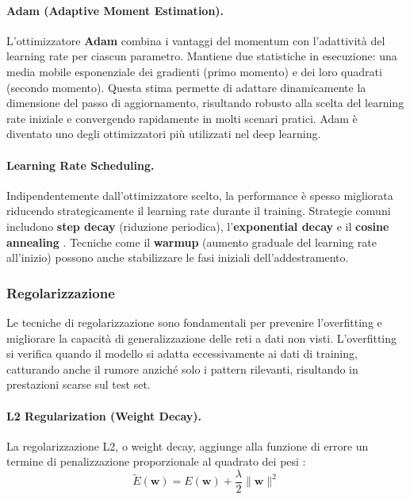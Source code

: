 \paragraph{Adam (Adaptive Moment Estimation).}
L'ottimizzatore \textbf{Adam} \cite{kingma2014adam} combina i vantaggi del momentum con l'adattività del learning rate per ciascun parametro. Mantiene due statistiche in esecuzione: una media mobile esponenziale dei gradienti (primo momento) e dei loro quadrati (secondo momento). Questa stima permette di adattare dinamicamente la dimensione del passo di aggiornamento, risultando robusto alla scelta del learning rate iniziale e convergendo rapidamente in molti scenari pratici. Adam è diventato uno degli ottimizzatori più utilizzati nel deep learning.

\paragraph{Learning Rate Scheduling.} Indipendentemente dall'ottimizzatore scelto, la performance è spesso migliorata riducendo strategicamente il learning rate durante il training. 
Strategie comuni includono \textbf{step decay} (riduzione periodica), l'\textbf{exponential decay} e il \textbf{cosine annealing} \cite{goodfellow2016deep}. Tecniche come il \textbf{warmup} (aumento graduale del learning rate all'inizio) possono anche stabilizzare le fasi iniziali dell'addestramento.


\subsubsection{Regolarizzazione}

Le tecniche di regolarizzazione sono fondamentali per prevenire l'overfitting e migliorare la capacità di generalizzazione delle reti a dati non visti. L'overfitting si verifica quando il modello si adatta eccessivamente ai dati di training, catturando anche il rumore anziché solo i pattern rilevanti, risultando in prestazioni scarse sul test set.

\paragraph{L2 Regularization (Weight Decay).} 
La regolarizzazione L2, o weight decay, aggiunge alla funzione di errore un termine di penalizzazione proporzionale al quadrato dei pesi \cite{bishop2006pattern}:
\[
\tilde{E}(\mathbf{w}) = E(\mathbf{w}) + \frac{\lambda}{2} \|\mathbf{w}\|^2
\]

